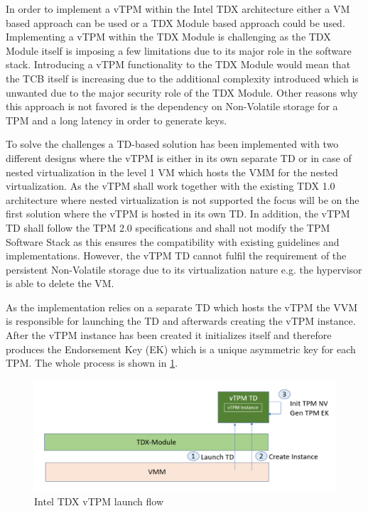 \documentclass[sigplan,screen,nonacm]{acmart}
\begin{document}
In order to implement a vTPM within the Intel TDX architecture either a VM based approach can be used or a TDX Module based approach could be used.
Implementing a vTPM within the TDX Module is challenging as the TDX Module itself is imposing a few limitations due to its major role in the software stack.
Introducing a vTPM functionality to the TDX Module would mean that the TCB itself is increasing due to the additional complexity introduced which is unwanted due to the major security role of the TDX Module\cite[p. 4]{Intel-vTPM}.
Other reasons why this approach is not favored is the dependency on Non-Volatile storage for a TPM and a long latency in order to generate keys\cite[p. 4]{Intel-vTPM}.

To solve the challenges a TD-based solution has been implemented with two different designs where the vTPM is either in its own separate TD or in case of nested virtualization in the level 1 VM which hosts the VMM for the nested virtualization.
As the vTPM shall work together with the existing TDX 1.0 architecture where nested virtualization is not supported the focus will be on the first solution where the vTPM is hosted in its own TD\cite[p. 5]{Intel-vTPM}.
In addition, the vTPM TD shall follow the TPM 2.0 specifications and shall not modify the TPM Software Stack as this ensures the compatibility with existing guidelines and implementations\cite[p. 5]{Intel-vTPM}.
However, the vTPM TD cannot fulfil the requirement of the persistent Non-Volatile storage due to its virtualization nature e.g. the hypervisor is able to delete the VM.

As the implementation relies on a separate TD which hosts the vTPM the VVM is responsible for launching the TD and afterwards creating the vTPM instance.
After the vTPM instance has been created it initializes itself and therefore produces the Endorsement Key (EK) which is a unique asymmetric key for each TPM.
The whole process is shown in \cref{fig:vtpmlaunch}.

\begin{figure}
  \centering
  \includegraphics[width=\linewidth]{pictures/vTPM_launch.png}
  \caption{Intel TDX vTPM launch flow \cite{Intel-vTPM}}
  \label{fig:vtpmlaunch}
\end{figure}
\end{document}
